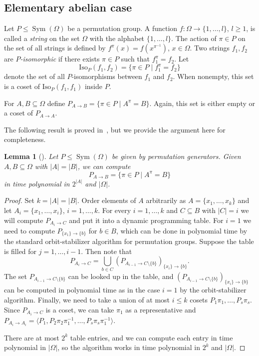 \documentclass{article}
\newtheorem{lemma}[theorem]{Lemma}
\DeclareMathOperator{\Sym}{Sym}
\begin{document}
\subsection{Elementary abelian case}

Let \( P \leq \Sym(\Omega) \) be a permutation group. A function \( f : \Omega \to \{ 1, \dots, l \} \), \( l \geq 1 \),
is called a \emph{string} on the set \( \Omega \) with the alphabet \( \{ 1, \dots, l \} \). The action of \( \pi \in P \)
on the set of all strings is defined by \( f^\pi(x) = f(x^{\pi^{-1}}) \), \( x \in \Omega \).
Two strings \( f_1, f_2 \) are \emph{\( P \)-isomorphic} if there exists \( \pi \in P \) such that \( f_1^\pi = f_2 \). Let
\[ \mathrm{Iso}_P(f_1, f_2) = \{ \pi \in P \mid f_1^{\pi} = f_2 \} \]
denote the set of all \( P \)-isomorphisms between \( f_1 \) and \( f_2 \). When nonempty, this set is a coset of \( \mathrm{Iso}_P(f_1, f_1) \) inside \( P \).

For \( A, B \subseteq \Omega \) define \( P_{A \to B} = \{ \pi \in P \mid A^\pi = B \} \). Again, this set is either empty
or a coset of \( P_{A \to A} \).

The following result is proved in~\cite[Subsection~5.1.1]{absyl}, but we provide the argument here for completeness.

\begin{lemma}[{\cite[Proposition~4]{absyl}}]\label{lsubset}
	Let \( P \leq \Sym(\Omega) \) be given by permutation generators. Given \( A, B \subseteq \Omega \) with \( |A| = |B| \), we can compute
	\[ P_{A \to B} = \{ \pi \in P \mid A^\pi = B \} \]
	in time polynomial in \( 2^{|A|} \) and \( |\Omega| \).
\end{lemma}
\begin{proof}
	Set \( k = |A| = |B| \). Order elements of \( A \) arbitrarily as \( A = \{ x_1, \dots, x_k \} \)
	and let \( A_i = \{ x_1, \dots, x_i \} \), \( i = 1, \dots, k \). For every \( i = 1, \dots, k \)
	and \( C \subseteq B \) with \( |C| = i \) we will compute \( P_{A_i \to C} \) and put it into a dynamic programming table.
	For \( i = 1 \) we need to compute \( P_{\{ x_1 \} \to \{ b \}} \) for \( b \in B \), which can be done
	in polynomial time by the standard orbit-stabilizer algorithm for permutation groups.
	Suppose the table is filled for \( j = 1, \dots, i-1 \). Then note that
	\[ P_{A_i \to C} = \bigcup_{b \in C} (P_{A_{i-1} \to C \setminus \{ b \}})_{\{ x_i \} \to \{ b \}}. \]
	The set \( P_{A_{i-1} \to C \setminus \{ b \} } \) can be looked up in the table, and \( (P_{A_{i-1} \to C \setminus \{ b \}})_{\{ x_i \} \to \{ b \}} \)
	can be computed in polynomial time as in the case \( i = 1 \) by the orbit-stabilizer algorithm. Finally, we need to take a union of at most \( i \leq k \) cosets
	\( P_1\pi_1, \dots, P_s\pi_s \). Since \( P_{A_i \to C} \) is a coset, we can take \( \pi_1 \) as a representative
	and \( P_{A_i \to A_i} = \langle P_1, P_2\pi_2\pi_1^{-1}, \dots, P_s\pi_s\pi_1^{-1} \rangle \).

	There are at most \( 2^k \) table entries, and we can compute each entry in time polynomial in \( |\Omega| \),
	so the algorithm works in time polynomial in \( 2^k \) and \( |\Omega| \).
\end{proof}
\end{document}
